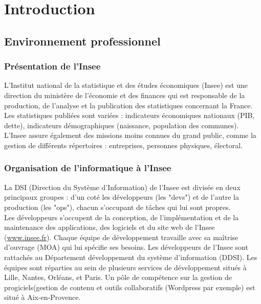 \documentclass[11pt,fleqn]{book} %
\begin{document}
\pagestyle{fancy} %


\mainmatter
\part{\textcolor{ocre}{Introduction}}
\chapter{Environnement professionnel}
\vspace{-2cm}
\section{Présentation de l'Insee}
L’Institut national de la statistique et des études économiques (Insee) est une direction du ministère de l'économie et des finances qui est responsable de la production, de l'analyse et la publication des statistiques concernant la France. Les statistiques publiées sont variées : indicateurs économiques nationaux (PIB, dette), indicateurs démographiques (naissance, population des communes). L'Insee assure également des missions moins connues du grand public, comme la gestion de différents répertoires : entreprises, personnes physiques, électoral.

\section{Organisation de l'informatique à l'Insee}
La DSI (Direction du Système d'Information) de l’Insee est divisée en deux principaux groupes :  d'un coté les développeurs (les "devs") et de l'autre la production (les "ops"), chacun s'occupant de tâches qui lui sont propres.\\

Les développeurs s'occupent de la conception, de l'implémentation et de la maintenance des applications, des logiciels et du site web de l'Insee (\url{www.insee.fr}). Chaque équipe de développement travaille avec sa maîtrise d'ouvrage (MOA) qui lui spécifie ses besoins. Les développeurs de l’Insee sont rattachés au Département développement du système d’information (DDSI). Les équipes sont réparties au sein de plusieurs services de développement situés à Lille, Nantes,  Orléans, et Paris. Un pôle de compétence sur la gestion de progiciels(gestion de contenu et outils collaboratifs (Wordpress par exemple) est situé à Aix-en-Provence.\\
\end{document}
